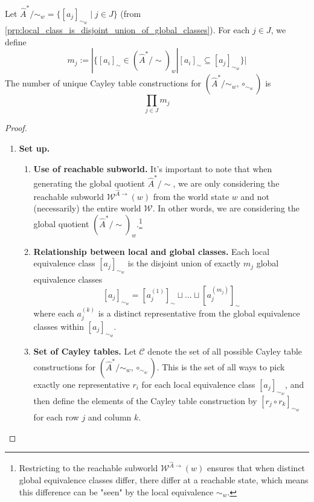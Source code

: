 \begin{proposition}\label{prp:num_unique_cayley_table_constructions_is_product}
    Let $\hat{A}^{*}/\sim_{w} = \{ [a_{j}]_{\sim_{w}} \mid j \in J \}$ (from \cref{prp:local_class_is_disjoint_union_of_global_classes}).
    For each $j \in J$, we define
    \begin{equation}
        m_{j} := |\{ [a_{i}]_{\sim} \in (\hat{A}^{*}/\sim)_{w} | [a_{i}]_{\sim} \subseteq [a_{j}]_{\sim_{w}} \}|
    \end{equation}
    The number of unique Cayley table constructions for $(\hat{A}^{*}/\sim_{w}, \circ_{\sim_{w}})$ is
    \begin{equation}
        \prod_{j \in J} m_{j}
    \end{equation}
\end{proposition}
\begin{proof}
\begin{enumerate}[(1)]
    \item \textbf{Set up.}
    \begin{enumerate}
        \item \textbf{Use of reachable subworld.}
        It's important to note that when generating the global quotient $\hat{A}^{*}/\sim$, we are only considering the reachable subworld $\mathscr{W}^{\hat{A}\to}(w)$ from the world state $w$ and not (necessarily) the entire world $\mathscr{W}$.
        In other words, we are considering the global quotient $(\hat{A}^{*}/\sim)_{w}$.\footnote{
        Restricting to the reachable subworld $\mathscr{W}^{\hat{A}\to}(w)$ ensures that when distinct global equivalence classes differ, there differ at a reachable state, which means this difference can be "seen" by the local equivalence $\sim_{w}$.
        }

        \item \textbf{Relationship between local and global classes.}
        Each local equivalence class $[a_{j}]_{\sim_{w}}$ is the disjoint union of exactly $m_{j}$ global equivalence classes
        \begin{equation}\label{eqn:local_class_is_disjoint_union_of_global_classes}
            [a_{j}]_{\sim_{w}} = [a_{j}^{(1)}]_{\sim} \sqcup \dots \sqcup [a_{j}^{(m_{j})}]_{\sim}
        \end{equation}
        where each $a_{j}^{(k)}$ is a distinct representative from the global equivalence classes within $[a_{j}]_{\sim_{w}}$.
    
        \item \textbf{Set of Cayley tables.}
        Let $\mathcal{C}$ denote the set of all possible Cayley table constructions for $(\hat{A}^{*}/\sim_{w}, \circ_{\sim_{w}})$.
        This is the set of all ways to pick exactly one representative $r_{i}$ for each local equivalence class $[a_{j}]_{\sim_{w}}$, and then define the elements of the Cayley table construction by $[r_{j} \circ r_{k}]_{\sim_{w}}$ for each row $j$ and column $k$.


\end{enumerate}
\end{enumerate}
\end{proof}

